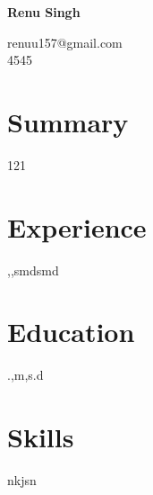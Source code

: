 \documentclass[10pt]{article}
\begin{document}
\textbf{\Large Renu Singh}

renuu157@gmail.com \\
4545

\section*{Summary}
121

\section*{Experience}
 ,,smdsmd

\section*{Education}
.,m,s.d

\section*{Skills}
nkjsn
\end{document}
